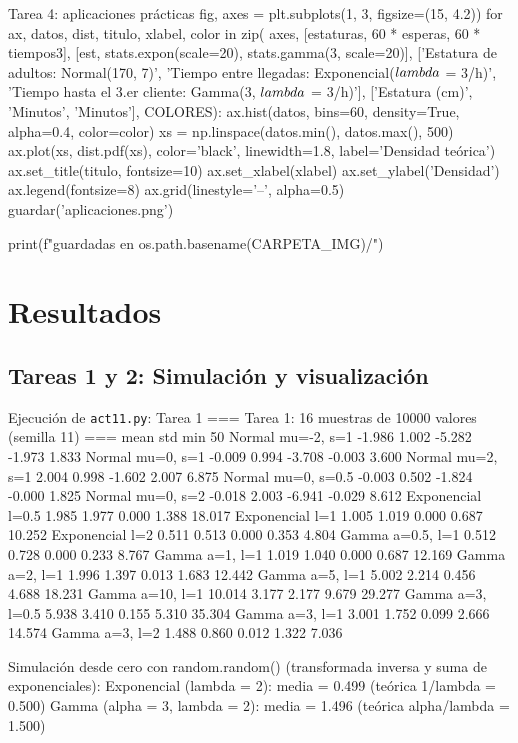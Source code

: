 \documentclass[11pt,letterpaper]{article}
\begin{document}
\begin{codigo}[label=cod:t4]{Tarea 4: aplicaciones prácticas}
fig, axes = plt.subplots(1, 3, figsize=(15, 4.2))
for ax, datos, dist, titulo, xlabel, color in zip(
        axes, [estaturas, 60 * esperas, 60 * tiempos3],
        [est, stats.expon(scale=20), stats.gamma(3, scale=20)],
        ['Estatura de adultos: Normal(170, 7)', 'Tiempo entre llegadas: Exponencial($\\lambda$ = 3/h)',
         'Tiempo hasta el 3.er cliente: Gamma(3, $\\lambda$ = 3/h)'],
        ['Estatura (cm)', 'Minutos', 'Minutos'], COLORES):
    ax.hist(datos, bins=60, density=True, alpha=0.4, color=color)
    xs = np.linspace(datos.min(), datos.max(), 500)
    ax.plot(xs, dist.pdf(xs), color='black', linewidth=1.8, label='Densidad teórica')
    ax.set_title(titulo, fontsize=10)
    ax.set_xlabel(xlabel)
    ax.set_ylabel('Densidad')
    ax.legend(fontsize=8)
    ax.grid(linestyle='--', alpha=0.5)
guardar('aplicaciones.png')

print(f"\nFiguras guardadas en {os.path.basename(CARPETA_IMG)}/")
\end{codigo}

\section{Resultados}

\subsection{Tareas 1 y 2: Simulación y visualización}

\begin{consola}[label=out:t1]{Ejecución de \texttt{act11.py}: Tarea 1}
=== Tarea 1: 16 muestras de 10000 valores (semilla 11) ===
                      mean    std    min    50%
Normal mu=-2, s=1   -1.986  1.002 -5.282 -1.973   1.833
Normal mu=0, s=1    -0.009  0.994 -3.708 -0.003   3.600
Normal mu=2, s=1     2.004  0.998 -1.602  2.007   6.875
Normal mu=0, s=0.5  -0.003  0.502 -1.824 -0.000   1.825
Normal mu=0, s=2    -0.018  2.003 -6.941 -0.029   8.612
Exponencial l=0.5    1.985  1.977  0.000  1.388  18.017
Exponencial l=1      1.005  1.019  0.000  0.687  10.252
Exponencial l=2      0.511  0.513  0.000  0.353   4.804
Gamma a=0.5, l=1     0.512  0.728  0.000  0.233   8.767
Gamma a=1, l=1       1.019  1.040  0.000  0.687  12.169
Gamma a=2, l=1       1.996  1.397  0.013  1.683  12.442
Gamma a=5, l=1       5.002  2.214  0.456  4.688  18.231
Gamma a=10, l=1     10.014  3.177  2.177  9.679  29.277
Gamma a=3, l=0.5     5.938  3.410  0.155  5.310  35.304
Gamma a=3, l=1       3.001  1.752  0.099  2.666  14.574
Gamma a=3, l=2       1.488  0.860  0.012  1.322   7.036

Simulación desde cero con random.random() (transformada inversa y suma de exponenciales):
  Exponencial (lambda = 2):          media = 0.499  (teórica 1/lambda = 0.500)
  Gamma (alpha = 3, lambda = 2):     media = 1.496  (teórica alpha/lambda = 1.500)
\end{consola}
\end{document}
